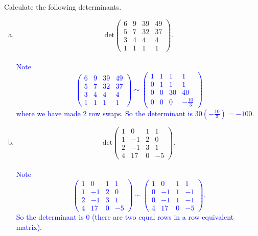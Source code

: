 \documentclass[a4paper,11pt]{article}
\newcommand{\BB}[1]{\textcolor{blue}{#1}}
\begin{document}
 Calculate the following determinants.
\begin{enumerate}[(a)]
\item
  \[
    \text{det}
    \left(
      \begin{array}{rrrr}
        6 & 9 & 39 & 49 \\
        5 & 7 & 32 & 37 \\
        3 & 4 & 4 & 4 \\
        1 & 1 & 1 & 1
      \end{array}
    \right).
  \] \\

  \BB{Note
    \[
      \left(
        \begin{array}{rrrr}
          6 & 9 & 39 & 49 \\
          5 & 7 & 32 & 37 \\
          3 & 4 & 4 & 4 \\
          1 & 1 & 1 & 1
        \end{array}
      \right)
      \sim
      \left(
        \begin{array}{rrrr}
          1 & 1 & 1 & 1 \\
          0 & 1 & 1 & 1 \\
          0 & 0 & 30 & 40 \\
          0 & 0 & 0 & -\frac{10}{3}
        \end{array}
      \right)
    \]
    where we have made 2 row swaps. So the determinant is
    $30(-\frac{10}{3})=-100$. \\}
  
\item
  \[
    \text{det}
    \left(
      \begin{array}{rrrr}
        1 & 0 & 1 & 1 \\
        1 & -1 & 2 & 0 \\
        2 & -1 & 3 & 1 \\
        4 & 17 & 0 & -5
      \end{array}
    \right).
  \] \\

  \BB{Note
    \[
      \left(
        \begin{array}{rrrr}
          1 & 0 & 1 & 1 \\
          1 & -1 & 2 & 0 \\
          2 & -1 & 3 & 1 \\
          4 & 17 & 0 & -5
        \end{array}
      \right)
      \sim
      \left(
        \begin{array}{rrrr}
          1 & 0 & 1 & 1 \\
          0 & -1 & 1 & -1 \\
          0 & -1 & 1 & -1 \\
          4 & 17 & 0 & -5
        \end{array}
      \right).
    \]
    So the determinant is 0 (there are two equal rows in a row equivalent
    matrix). \\}
  

\end{enumerate}
\end{document}
